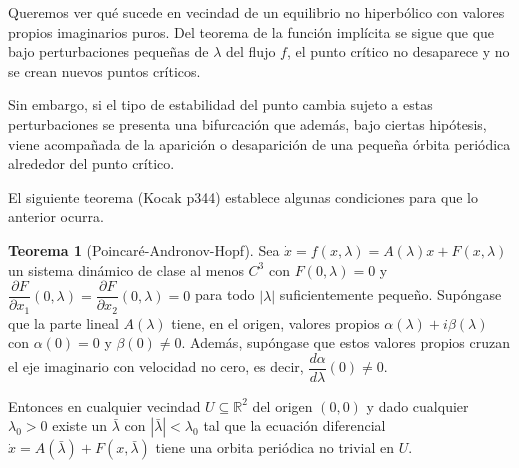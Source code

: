 \documentclass[11pt]{book}
\theoremstyle{definition}
\numberwithin{definition}{section}
\theoremstyle{theorem}
\newtheorem{theorem}{Teorema}
\numberwithin{theorem}{section}
\numberwithin{lemma}{section}
\numberwithin{corollary}{section}
\theoremstyle{plain}
\numberwithin{example}{section}
\newcommand{\R}{{\ensuremath{\mathbb{R}}}}
\begin{document}
Queremos ver qué sucede en vecindad de un equilibrio no hiperbólico con valores propios imaginarios puros. Del teorema de la función implícita se sigue que que bajo perturbaciones pequeñas de $\lambda$ del flujo $f$, el punto crítico no desaparece y no se crean nuevos puntos críticos.

Sin embargo, si el tipo de estabilidad del punto cambia sujeto a estas perturbaciones se presenta una bifurcación que además, bajo ciertas hipótesis, viene acompañada de la aparición o desaparición de una pequeña órbita periódica alrededor del punto crítico.

El siguiente teorema (Kocak p344) establece algunas condiciones para que lo anterior ocurra.

\begin{theorem}[Poincaré-Andronov-Hopf] \label{teo:poincare-andronov-hopf} Sea $\dot{x} = f(x,\lambda) = A(\lambda)x + F(x,\lambda)$ un sistema dinámico de clase al menos $C^3$ con $F(0,\lambda) = 0$ y $\dfrac{\partial F}{\partial x_1}(0, \lambda) = \dfrac{\partial F}{\partial x_2}(0, \lambda) = 0$ para todo $|\lambda|$ suficientemente pequeño. Supóngase que la parte lineal $A(\lambda)$ tiene, en el origen, valores propios $\alpha(\lambda) + i\beta(\lambda)$ con $\alpha(0) = 0$ y $\beta(0) \neq 0$.
Además, supóngase que estos valores propios cruzan el eje imaginario con velocidad no cero, es decir, $\dfrac{d\alpha}{d\lambda}(0) \neq 0$.

Entonces en cualquier vecindad $U \subseteq \R^2$ del origen $(0,0)$ y dado cualquier $\lambda_0 > 0$ existe un $\bar{\lambda}$ con $|\bar{\lambda}| < \lambda_0$ tal que la ecuación diferencial $\dot{x} = A(\bar{\lambda}) + F(x, \bar{\lambda})$ tiene una orbita periódica no trivial en $U$.
\end{theorem}
\end{document}
